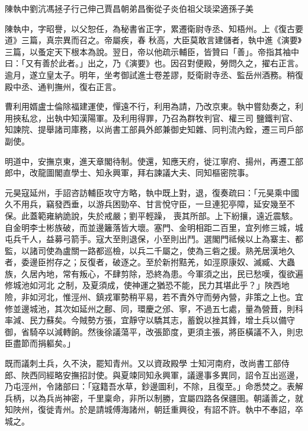 
\begin{pinyinscope}

 陳執中劉沆馮拯子行己伸己賈昌朝弟昌衡從子炎伯祖父琰梁適孫子美



 陳執中，字昭譽，以父恕任，為秘書省正字，累遷衛尉寺丞、知梧州。上《復古要道》三篇，真宗異而召之。帝屬疾，春
 秋高，大臣莫敢言建儲者，執中進《演要》三篇，以蚤定天下根本為說。翌日，帝以他疏示輔臣，皆贊曰「善」。帝指其袖中曰：「又有善於此者。」出之，乃《演要》也。因召對便殿，勞問久之，擢右正言。逾月，遂立皇太子。明年，坐考御試進士卷差謬，貶衛尉寺丞、監岳州酒務。稍復殿中丞、通判撫州，復右正言。



 曹利用婿盧士倫除福建運使，憚遠不行，利用為請，乃改京東。執中嘗劾奏之，利用挾私忿，出執中知漢陽軍。及利用得罪，乃召為群牧判官、權三司
 鹽鐵判官、知諫院、提舉諸司庫務，以尚書工部員外郎兼御史知雜、同判流內銓，遷三司戶部副使。



 明道中，安撫京東，進天章閣待制。使還，知應天府，徙江寧府、揚州，再遷工部郎中，改龍圖閣直學士、知永興軍，拜右諫議大夫、同知樞密院事。



 元昊寇延州，手詔咨訪輔臣攻守方略，執中既上對，退，復奏疏曰：「元昊乘中國久不用兵，竊發西垂，以游兵困勁卒、甘言悅守臣，一旦連犯亭障，延安幾至不保。此蓋範雍納詭說，失於戒嚴；劉平輕躁，
 喪其所部。上下紛攘，遠近震駭。自金明李士彬族破，而並邊籬落皆大壞。塞門、金明相距二百里，宜列修三城，城屯兵千人，益募弓箭手。寇大至則退保，小至則出鬥。選閣門祗候以上為寨主、都監，以諸司使為盧關一路都巡檢，以兵二千屬之，使為三砦之援。熟羌居漢地久者，委邊臣拊存之；反復者，破逐之。至於新拊黠羌，如涇原康奴、滅臧、大蟲族，久居內地，常有叛心，不肆剪除，恐終為患。今軍須之出，民已愁嘆，復欲遍修城池如河北
 之制，及夏須成，使神運之猶恐不能，民力其堪此乎？」陜西地險，非如河北，惟涇州、鎮戎軍勢稍平易，若不責外守而勞內營，非策之上也。宜修並邊城池，其次如延州之鄜、同，環慶之邠、寧，不過五七處，量為營葺，則科率減、民力蘇矣。今賊勢方張，宜靜守以驕其志，蓄銳以挫其鋒，增土兵以備守御，省騎卒以減轉餉。然後徐議蕩平，改張節度，更須主張，將臣橫議不入，則忠臣盡節而捐軀矣。」



 既而議刺土兵，久不決，罷知青州。又以資政殿學
 士知河南府，改尚書工部侍郎、陜西同經略安撫招討使。與夏竦同知永興軍，議邊事多異同，詔令互出巡邊，乃屯涇州，令諸部曰：「寇籍吾水草，鈔邊圖利，不除，且復至。」命悉焚之。表解兵柄，以為兵尚神密，千里稟命，非所以制勝，宜屬四路各保疆圉。朝議善之，就知陜州，復徙青州。於是請城傅海諸州，朝廷重興役，有詔不許。執中不奉詔，卒城之。




\end{pinyinscope}
